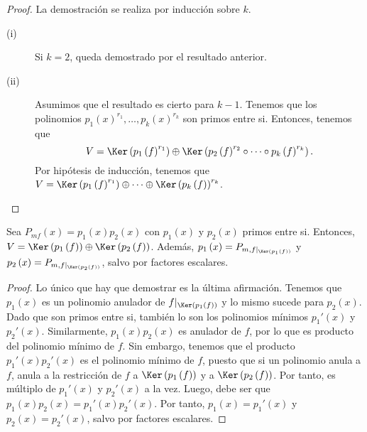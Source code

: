 \begin{proof}
La demostración se realiza por inducción sobre $\displaystyle k $. 
\begin{description}
\item[(i)] Si $\displaystyle k=2 $, queda demostrado por el resultado anterior.
\item[(ii)] Asumimos que el resultado es cierto para $\displaystyle k - 1 $. Tenemos que los polinomios $\displaystyle p_{1}\left(x\right)^{r_{1}}, \ldots, p_{k}\left(x\right)^{r_{k}} $ son primos entre si. Entonces, tenemos que
	\[ V = \Ker\left(p_{1}\left(f\right)^{r_{1}}\right) \oplus \Ker\left(p_{2}\left(f\right)^{r_{2}} \circ \cdots \circ p_{k}\left(f\right)^{r_{k}}\right) .\]
Por hipótesis de inducción, tenemos que $\displaystyle V = \Ker\left(p_{1}\left(f\right)^{r_{1}}\right) \oplus \cdots \oplus \Ker\left(p_{k}\left(f\right)\right)^{r_{k}} $.
\end{description}
\end{proof}
\begin{fprop}[]
\normalfont Sea $\displaystyle P_{mf}\left(x\right) = p_{1}\left(x\right)p_{2}\left(x\right) $ con $\displaystyle p_{1}\left(x\right) $ y $\displaystyle p_{2}\left(x\right) $ primos entre si. Entonces, $\displaystyle V = \Ker\left(p_{1}\left(f\right)\right) \oplus \Ker\left(p_{2}\left(f\right)\right) $. Además, $\displaystyle p_{1}\left(x\right) = P_{m, f|_{\Ker\left(p_{1}\left(f\right)\right)}} $ y $\displaystyle p_{2}\left(x\right) = P_{m,f|_{\Ker\left(p_{2}\left(f\right)\right)}} $, salvo por factores escalares.
\end{fprop}
\begin{proof}
Lo único que hay que demostrar es la última afirmación. Tenemos que $\displaystyle p_{1}\left(x\right) $ es un polinomio anulador de $\displaystyle f|_{\Ker\left(p_{1}\left(f\right)\right)} $ y lo mismo sucede para $\displaystyle p_{2}\left(x\right) $. Dado que son primos entre si, también lo son los polinomios mínimos $\displaystyle p_{1}'\left(x\right) $ y $\displaystyle p_{2}'\left(x\right) $. Similarmente, $\displaystyle p_{1}\left(x\right)p_{2}\left(x\right) $ es anulador de $\displaystyle f $, por lo que es producto del polinomio mínimo de $\displaystyle f $. Sin embargo, tenemos que el producto $\displaystyle p_{1}'(x)p_{2}'\left(x\right) $ es el polinomio mínimo de $\displaystyle f $, puesto que si un polinomio anula a $\displaystyle f $, anula a la restricción de $\displaystyle f $ a $\displaystyle \Ker\left(p_{1}\left(f\right)\right) $ y a $\displaystyle \Ker\left(p_{2}\left(f\right)\right) $. 
Por tanto, es múltiplo de $\displaystyle p_{1}'\left(x\right) $ y $\displaystyle p_{2}'\left(x\right) $ a la vez. Luego, debe ser que $\displaystyle p_{1}\left(x\right) p_{2}\left(x\right) = p_{1}'\left(x\right)p_{2}'\left(x\right) $. Por tanto, $\displaystyle p_{1}\left(x\right) = p_{1}'\left(x\right) $ y $\displaystyle p_{2}\left(x\right) = p_{2}'\left(x\right) $, salvo por factores escalares.
\end{proof}
